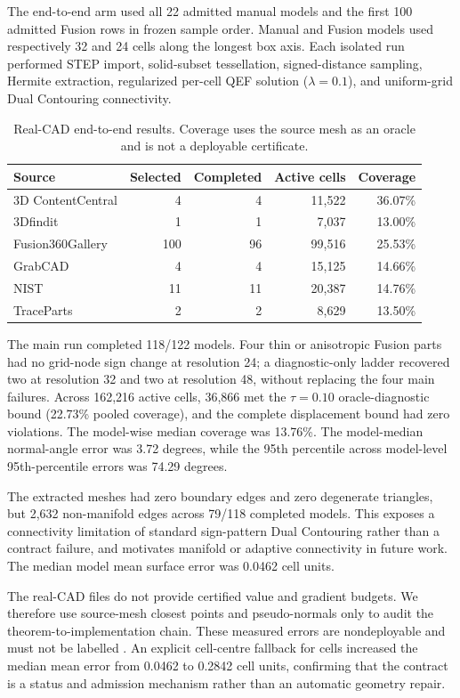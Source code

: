 The end-to-end arm used all 22 admitted manual models and the first 100 admitted
Fusion rows in frozen sample order.  Manual and Fusion models used respectively
32 and 24 cells along the longest box axis.  Each isolated run performed STEP
import, solid-subset tessellation, signed-distance sampling, Hermite extraction,
regularized per-cell QEF solution (\(\lambda=0.1\)), and uniform-grid Dual
Contouring connectivity.

\begin{table}[t]
\centering
\caption{Real-CAD end-to-end results. Coverage uses the source mesh as an
oracle and is not a deployable certificate.}
\label{tab:real-cad-dc}
\begin{tabular}{lrrrr}
\toprule
Source & Selected & Completed & Active cells & Coverage \\
\midrule
3D ContentCentral & 4 & 4 & 11,522 & 36.07\% \\
3Dfindit & 1 & 1 & 7,037 & 13.00\% \\
Fusion360Gallery & 100 & 96 & 99,516 & 25.53\% \\
GrabCAD & 4 & 4 & 15,125 & 14.66\% \\
NIST & 11 & 11 & 20,387 & 14.76\% \\
TraceParts & 2 & 2 & 8,629 & 13.50\% \\
\bottomrule
\end{tabular}
\end{table}

The main run completed 118/122 models.  Four thin or anisotropic Fusion parts
had no grid-node sign change at resolution 24; a diagnostic-only ladder recovered
two at resolution 32 and two at resolution 48, without replacing the four main
failures.  Across 162,216 active cells, 36,866 met the \(\tau=0.10\)
oracle-diagnostic bound (22.73\% pooled coverage), and the complete displacement
bound had zero violations.  The model-wise median coverage was 13.76\%.
The model-median normal-angle error was 3.72 degrees, while the 95th percentile
across model-level 95th-percentile errors was 74.29 degrees.

The extracted meshes had zero boundary edges and zero degenerate triangles, but
2,632 non-manifold edges across 79/118 completed models.  This exposes a
connectivity limitation of standard sign-pattern Dual Contouring rather than a
contract failure, and motivates manifold or adaptive connectivity in future
work.  The median model mean surface error was 0.0462 cell units.

The real-CAD files do not provide certified value and gradient budgets.  We
therefore use source-mesh closest points and pseudo-normals only to audit the
theorem-to-implementation chain.  These measured errors are nondeployable and
must not be labelled \Certified.  An explicit cell-centre fallback for
\Unknown cells increased the median mean error from 0.0462 to
0.2842 cell units, confirming that the contract is a status and
admission mechanism rather than an automatic geometry repair.

